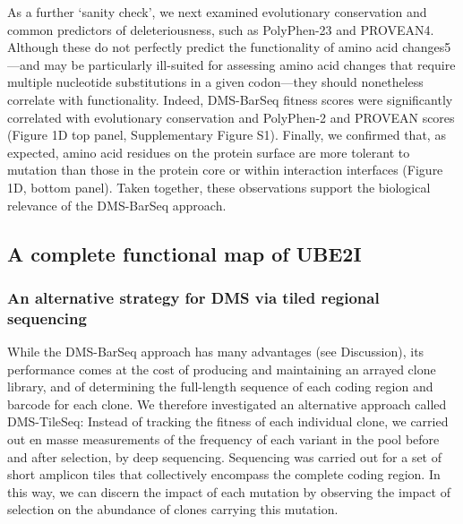 As a further ‘sanity check’, we next examined evolutionary conservation and common predictors of deleteriousness, such as PolyPhen-23 and PROVEAN4.  Although these do not perfectly predict the functionality of amino acid changes5 —and may be particularly ill-suited for assessing amino acid changes that require multiple nucleotide substitutions in a given codon—they should nonetheless correlate with functionality.  Indeed, DMS-BarSeq fitness scores were significantly correlated with evolutionary conservation and PolyPhen-2 and PROVEAN scores (Figure 1D top panel, Supplementary Figure S1). Finally, we confirmed that, as expected, amino acid residues on the protein surface are more tolerant to mutation than those in the protein core or within interaction interfaces (Figure 1D, bottom panel).  Taken together, these observations support the biological relevance of the DMS-BarSeq approach.

\subsection{A complete functional map of UBE2I}

\subsubsection{An alternative strategy for DMS via tiled regional sequencing}

While the DMS-BarSeq approach has many advantages (see Discussion), its performance comes at the cost of producing and maintaining an arrayed clone library, and of determining the full-length sequence of each coding region and barcode for each clone. We therefore investigated an alternative approach called DMS-TileSeq: Instead of tracking the fitness of each individual clone, we carried out en masse measurements of the frequency of each variant in the pool before and after selection, by deep sequencing.  Sequencing was carried out for a set of short amplicon tiles that collectively encompass the complete coding region.  In this way, we can discern the impact of each mutation by observing the impact of selection on the abundance of clones carrying this mutation.

